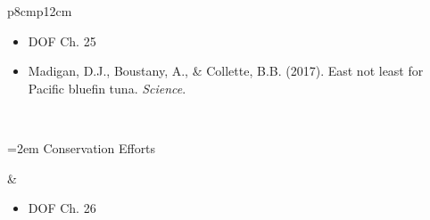 \documentclass[letterpaper]{inzane_syllabus} %
\begin{document}
\begin{center}
\begin{tabularx}{\textwidth}{p{8cm}p{12cm}}
\begin{minipage}[t]{\linewidth}%
\vspace{5pt}
\begin{itemize}
\item DOF Ch. 25
\item Madigan, D.J., Boustany, A., \& Collette, B.B. (2017). East not least for Pacific bluefin tuna. \textit{Science}. \vspace{5pt}
\end{itemize} 
\end{minipage}\\

\begin{minipage}[t]{\linewidth}%
\hangindent=2em
\hspace{2em}\textbullet Conservation Efforts \\
\end{minipage} & 
 
\begin{minipage}[t]{\linewidth}%
\begin{itemize}
\item DOF Ch. 26\\
\end{itemize} 
\end{minipage}\\
\hline
\end{tabularx}
\end{center}
\end{document}
